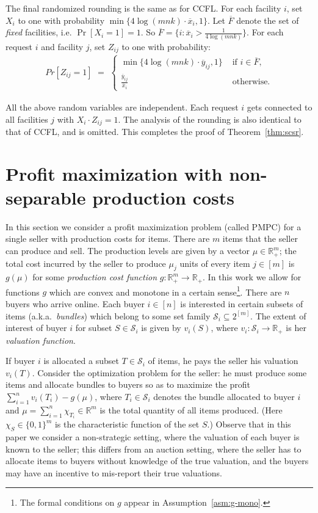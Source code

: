 \documentclass[letterpaper,11pt]{article}
\def \RR   {{\mathbb R}}
\newcommand{\ox}{\ensuremath{\overline{x}}\xspace}
\newcommand{\oy}{\ensuremath{\overline{y}}\xspace}
\def\oy{\overline{y}}
\def\ox{\overline{x}}
\def\oF{\overline{F}}
\def\cS{\mathcal{S}}
\def\sse{\subseteq}
\begin{document}
The final randomized rounding is the same as for CCFL. For each facility
$i$, set $X_i$ to one with probability $\min\{4\log (mnk) \cdot \ox_i,
1\}$. Let $\oF$ denote the set of {\em fixed} facilities,
i.e. $\Pr[X_i=1]=1$. So $\oF=\{i : \ox_{i} > \frac{1}{4\log
  (mnk)}\}$. For each request $i$ and facility $j$, set $Z_{ij}$ to one
with probability:
\begin{gather*}
  Pr[ Z_{ij}=1] \,\,=\,\, \left\{
    \begin{array}{ll}
      \min\{4\log (mnk)\cdot \oy_{ij}, 1\} & \mbox{ if }i\in \oF, \\
      \frac{\oy_{ij}}{\ox_i} & \mbox{ otherwise.}
    \end{array}
  \right.
\end{gather*}

All the above random variables are independent. Each request $i$ gets
connected to all facilities $j$ with $X_i\cdot Z_{ij}=1$.  The analysis
of the rounding is also identical to that of CCFL, and is omitted. This
completes the proof of Theorem~\ref{thm:scsr}.


\section{Profit maximization with non-separable production costs}
\label{sec:profit-max}

In this section we consider a profit maximization problem (called PMPC) for a single
seller with production costs for items. There are $m$ items that the
seller can produce and sell. The production levels are given by a vector
$\mu \in \RR_+^m$; the total cost incurred by the seller to produce $\mu_j$
units of every item $j\in [m]$ is $g(\mu)$ for some \emph{production cost
  function} $g:\RR_+^m\rightarrow \RR_+$. In this work we allow for
functions $g$ which are convex and monotone in a certain
sense\footnote{The formal conditions on $g$ appear in
  Assumption~\ref{asm:g-mono}.}. There are $n$ buyers who arrive
online. Each buyer $i\in[n]$ is interested in certain subsets of items
(a.k.a.\ \emph{bundles}) which belong to some set family $\cS_i \sse
2^{[m]}$. The extent of interest of buyer $i$ for subset $S \in \cS_i$
is given by $v_i(S)$, where $v_i:\cS_i\rightarrow \RR_+$ is her
\emph{valuation function}.

If buyer $i$ is allocated a subset $T\in \cS_i$ of items, he pays the
seller his valuation $v_i(T)$. Consider the optimization problem for the
seller: he must produce some items and allocate bundles to buyers so as
to maximize the profit $\sum_{i=1}^n v_i(T_i) - g(\mu)$, where $T_i\in
\cS_i$ denotes the bundle allocated to buyer $i$ and $\mu= \sum_{i=1}^n
\chi_{T_i}\in \RR^m$ is the total quantity of all items produced. (Here
$\chi_S \in \{0,1\}^m$ is the characteristic function of the set $S$.)
Observe that in this paper we consider a non-strategic setting, where
the valuation of each buyer is known to the seller; this differs from an
auction setting, where the seller has to allocate items to buyers
without knowledge of the true valuation, and the buyers may have an
incentive to mis-report their true valuations.
\end{document}
